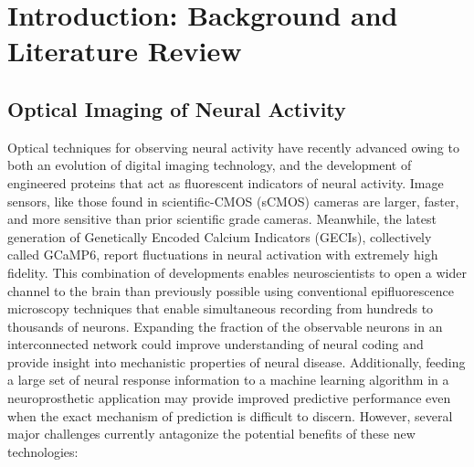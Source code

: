% 

\thispagestyle{myheadings}

\chapter{Introduction: Background and Literature Review}
\label{sec:introduction}


\section{Optical Imaging of Neural Activity}\label{sec:optical-imaging-of-neural-activity}

Optical techniques for observing neural activity have recently advanced owing to both an evolution of digital imaging technology, and the development of engineered proteins that act as fluorescent indicators of neural activity.
Image sensors, like those found in scientific-CMOS (sCMOS) cameras are larger, faster, and more sensitive than prior scientific grade cameras.
Meanwhile, the latest generation of Genetically Encoded Calcium Indicators (GECIs), collectively called GCaMP6, report fluctuations in neural activation with extremely high fidelity.
This combination of developments enables neuroscientists to open a wider channel to the brain than previously possible using conventional epifluorescence microscopy techniques that enable simultaneous recording from hundreds to thousands of neurons.
Expanding the fraction of the observable neurons in an interconnected network could improve understanding of neural coding and provide insight into mechanistic properties of neural disease.
Additionally, feeding a large set of neural response information to a machine learning algorithm in a neuroprosthetic application may provide improved predictive performance even when the exact mechanism of prediction is difficult to discern.
However, several major challenges currently antagonize the potential benefits of these new technologies:

